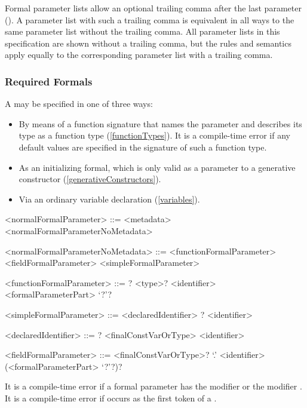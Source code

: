\documentclass[makeidx]{article}
\begin{document}
\LMHash{}%
Formal parameter lists allow an optional trailing comma
after the last parameter ().
A parameter list with such a trailing comma is
equivalent in all ways to the same parameter list without the trailing comma.
All parameter lists in this specification are shown without a trailing comma,
but the rules and semantics apply equally to
the corresponding parameter list with a trailing comma.


\subsubsection{Required Formals}

\LMHash{}%
A  may be specified in one of three ways:

\begin{itemize}
\item
  By means of a function signature that names the parameter and
  describes its type as a function type (\ref{functionTypes}).
  It is a compile-time error if any default values are specified
  in the signature of such a function type.
\item
  As an initializing formal, which is only valid as a parameter to
  a generative constructor (\ref{generativeConstructors}).
\item
  Via an ordinary variable declaration (\ref{variables}).
\end{itemize}

\begin{grammar}
<normalFormalParameter> ::= \gnewline{}
  <metadata> <normalFormalParameterNoMetadata>

<normalFormalParameterNoMetadata> ::= <functionFormalParameter>
  \alt <fieldFormalParameter>
  \alt <simpleFormalParameter>

<functionFormalParameter> ::= \gnewline{}
  \COVARIANT? <type>? <identifier> <formalParameterPart> `?'?

<simpleFormalParameter> ::= <declaredIdentifier>
  \alt \COVARIANT? <identifier>

<declaredIdentifier> ::= \COVARIANT? <finalConstVarOrType> <identifier>

<fieldFormalParameter> ::= \gnewline{}
  <finalConstVarOrType>? \THIS{} `.' <identifier> (<formalParameterPart> `?'?)?
\end{grammar}

\LMHash{}%
It is a compile-time error if a formal parameter has the modifier \CONST{}
or the modifier \LATE.
It is a compile-time error if \VAR{} occurs as
the first token of a .
\end{document}
